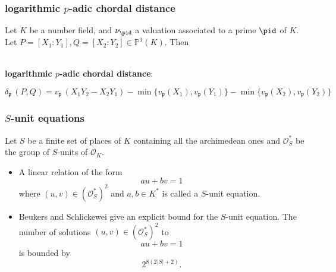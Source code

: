 \documentclass{beamer}
\def\jump{ \quad \\ \vspace{0.7cm} \pause}
\def\PP{{\mathbb P}}
\theoremstyle{thmstyle}
\theoremstyle{thmstyle}
\theoremstyle{mystyle}
\theoremstyle{qstnstyle}
\begin{document}
\begin{frame}
\frametitle{logarithmic $p$-adic chordal distance}

Let $K$ be a number field, and $\nu_{\pid}$ a valuation associated to a prime $\pid$ of $K$. 
\quad \\ 

Let $P=[X_1:Y_1], Q=[X_2:Y_2] \in \PP^1(K)$. Then

\quad \\ \pause
\textbf{logarithmic $p$-adic chordal distance}:

$$\delta_{\mathfrak{p}}\,(P,Q)=v_{\mathfrak{p}}\,(X_1Y_2-X_2Y_1)-\min\{v_{\mathfrak{p}}(X_1),v_{\mathfrak{p}}(Y_1)\}-\min\{v_{\mathfrak{p}}(X_2),v_{\mathfrak{p}}(Y_2)\}$$
\end{frame}

%


\begin{frame}
\frametitle{$S$-unit equations}
Let $S$ be a finite set of places of $K$ containing all the archimedean ones and $\mathcal{O}_S^{*}$ be the group of $S$-units of $\mathcal{O}_K$.\pause

\begin{itemize}

\item A linear relation of the form $$au+bv=1$$  where  $(u,v) \in \left(\mathcal{O}_S^*\right)^2$ and $a,b\in K^{*}$ is called a $S$-unit equation. \pause
\item Beukers and Schlickewei give an explicit bound  for the $S$-unit equation. The number of solutions $(u,v) \in \left(\mathcal{O}_S^{*}\right)^2$ to 
$$au+bv=1$$ 
is bounded by $$2^{8(2|S|+2)}.$$
\end{itemize}
\end{frame}
\end{document}
